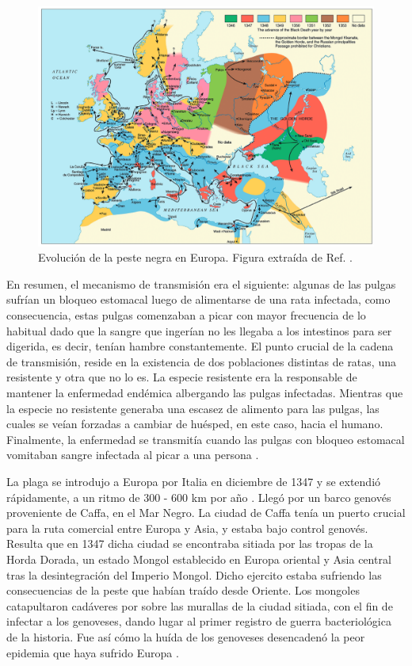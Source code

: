 \begin{figure}[!b]
    \centering
    \includegraphics[width=\imsizeL]{Black_Death.png}
    \caption[Evolución de la peste negra en Europa.]{Evolución de la peste negra en Europa. Figura extraída de Ref. \cite{black_death}.}
    \label{fig:Black_Death}
\end{figure}

En resumen, el mecanismo de transmisión era el siguiente: algunas de las pulgas sufrían un bloqueo estomacal luego de alimentarse de una rata infectada, como 
consecuencia, estas pulgas comenzaban a picar con mayor frecuencia de lo habitual dado que la sangre que ingerían no les llegaba a los intestinos para ser digerida, es decir,
tenían hambre constantemente. El punto 
crucial de la cadena de transmisión, reside en la existencia de dos poblaciones distintas de ratas, una resistente y otra que no lo es. La especie resistente era la responsable 
de mantener la enfermedad endémica albergando las pulgas infectadas. Mientras que la especie no resistente generaba una escasez de alimento para las pulgas, las cuales 
se veían forzadas a cambiar de huésped, en este caso, hacia el humano. Finalmente, la enfermedad se transmitía cuando las pulgas con bloqueo estomacal vomitaban sangre infectada
al picar a una persona \cite{black_death2}.


La plaga se introdujo a Europa por Italia en diciembre de 1347 y se extendió rápidamente, a un ritmo de 300 - 600 km por año \cite{Murray2003}. Llegó por 
un barco genovés proveniente de Caffa, en el Mar Negro. La ciudad de Caffa tenía un puerto crucial para la ruta comercial entre Europa y Asia, y estaba bajo control 
genovés. Resulta que en 1347 dicha ciudad se encontraba sitiada por las tropas de la Horda Dorada, un estado Mongol establecido en Europa oriental y Asia central tras la
desintegración del Imperio Mongol. Dicho ejercito estaba sufriendo las consecuencias de la peste que habían traído desde Oriente. Los mongoles catapultaron cadáveres por sobre 
las murallas de la ciudad sitiada, con el fin de infectar a los genoveses, dando lugar al primer registro de guerra bacteriológica de la historia. Fue así cómo la huída 
de los genoveses desencadenó la peor epidemia que haya sufrido Europa \cite{mate_sist_bio}.

